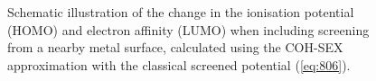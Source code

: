 \begin{solution}
\begin{figure}[b!]
    \caption{Schematic illustration of the change in the ionisation potential (HOMO) and electron affinity (LUMO) when including screening from a nearby metal surface, calculated using the COH-SEX approximation with the classical screened potential (\eqref{eq:806}).}
    \label{fig:image_energies}
\end{figure}
\end{solution}